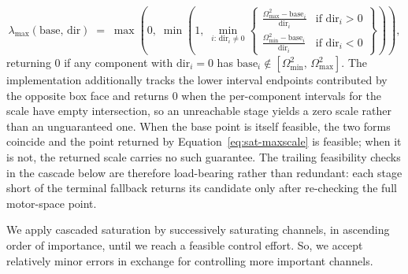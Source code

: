 \documentclass[conf]{new-aiaa}
\begin{document}
\small
\begin{equation}
\label{eq:sat-maxscale}
\lambda_{\max}(\text{base},\, \text{dir}) \;=\; \max\!\left(0,\; \min\!\left(1,\; \min_{i:\,\text{dir}_i \neq 0}\!\left\{
\begin{array}{ll}
\tfrac{\Omega^2_{\max} - \text{base}_i}{\text{dir}_i} & \text{if dir}_i > 0 \\[3pt]
\tfrac{\Omega^2_{\min} - \text{base}_i}{\text{dir}_i} & \text{if dir}_i < 0
\end{array}
\right\}\right)\right),
\end{equation}
\normalsize
returning $0$ if any component with $\text{dir}_i = 0$ has $\text{base}_i \notin [\Omega^2_{\min},\, \Omega^2_{\max}]$. The implementation additionally tracks the lower interval endpoints contributed by the opposite box face and returns $0$ when the per-component intervals for the scale have empty intersection, so an unreachable stage yields a zero scale rather than an unguaranteed one. When the base point is itself feasible, the two forms coincide and the point returned by Equation~\ref{eq:sat-maxscale} is feasible; when it is not, the returned scale carries no such guarantee. The trailing feasibility checks in the cascade below are therefore load-bearing rather than redundant: each stage short of the terminal fallback returns its candidate only after re-checking the full motor-space point.

We apply cascaded saturation by successively saturating channels, in ascending order of importance, until we reach a feasible control effort. So, we accept relatively minor errors in exchange for controlling more important channels. 
\end{document}
